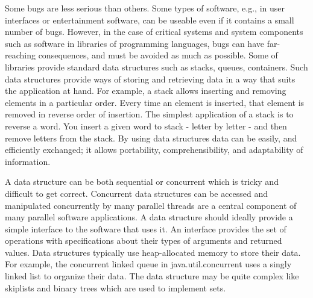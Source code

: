 Some bugs are less serious than others. Some types of software, e.g., in user interfaces or entertainment software, can be useable even if it contains a small number of bugs.
However, in the case of critical systems and system components such as software in libraries of programming languages, 
bugs can have far-reaching consequences, and must be avoided as much as possible.
Some of libraries provide standard data structures such as stacks, queues, containers. Such data structures provide ways of storing  
and retrieving data in a way that suits the application at hand. For example, a stack allows inserting and removing elements in a particular order. Every time an element is inserted, that element is removed
in reverse order of insertion. The simplest application of a stack is to reverse a word. You insert a given word to stack - letter by letter - and then remove letters from the stack.
By using data structures data can be easily, and efficiently exchanged; it allows portability, comprehensibility, and adaptability of information.

A data structure can be both sequential or concurrent which is tricky and difficult to get correct. Concurrent data structures can be accessed and manipulated concurrently by many parallel threads are a central component of many parallel software applications. A data structure should ideally provide a simple interface to the software that uses it. An interface provides the set of operations with specifications about their types of arguments and returned values. Data structures typically use heap-allocated memory to store their data. For example, the concurrent linked queue in java.util.concurrent uses a singly linked list to organize their data. The data structure may be quite complex like skiplists and binary trees which are used to implement sets.


